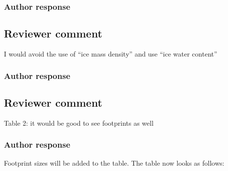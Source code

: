 \documentclass[11pt]{scrartcl}
\begin{document}
\subsubsection*{Author response}

\subsection*{Reviewer comment}
I would avoid the use of “ice mass density” and use “ice water content”

\subsubsection*{Author response}

\subsection*{Reviewer comment}
Table 2:  it would be good to see footprints as well

\subsubsection*{Author response}
Footprint sizes will be added to the table. The table now looks as follows:
\end{document}
